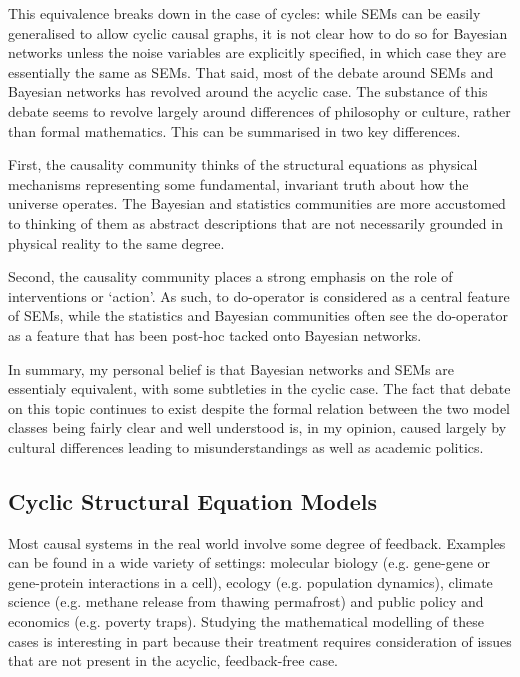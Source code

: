 This equivalence breaks down in the case of cycles: while SEMs can be easily generalised to allow cyclic causal graphs, it is not clear how to do so for Bayesian networks unless the noise variables are explicitly specified, in which case they are essentially the same as SEMs.
That said, most of the debate around SEMs and Bayesian networks has revolved around the acyclic case.
The substance of this debate seems to revolve largely around differences of philosophy or culture, rather than formal mathematics.
This can be summarised in two key differences.

First, the causality community thinks of the structural equations as physical mechanisms representing some fundamental, invariant truth about how the universe operates. 
The Bayesian and statistics communities are more accustomed to thinking of them as abstract descriptions that are not necessarily grounded in physical reality to the same degree.

Second, the causality community places a strong emphasis on the role of interventions or `action'.
As such, to do-operator is considered as a central feature of SEMs, while the statistics and Bayesian communities often see the do-operator as a feature that has been post-hoc tacked onto Bayesian networks.

In summary, my personal belief is that Bayesian networks and SEMs are essentialy equivalent, with some subtleties in the cyclic case. 
The fact that debate on this topic continues to exist despite the formal relation between the two model classes being fairly clear and well understood is, in my opinion, caused largely by cultural differences leading to misunderstandings as well as academic politics.

\subsection{Cyclic Structural Equation Models}

Most causal systems in the real world involve some degree of feedback. 
Examples can be found in a wide variety of settings: molecular biology (e.g. gene-gene or gene-protein interactions in a cell), ecology (e.g. population dynamics), climate science (e.g. methane release from thawing permafrost) and public policy and economics (e.g. poverty traps).
Studying the mathematical modelling of these cases is interesting in part because their treatment requires consideration of issues that are not present in the acyclic, feedback-free case.


